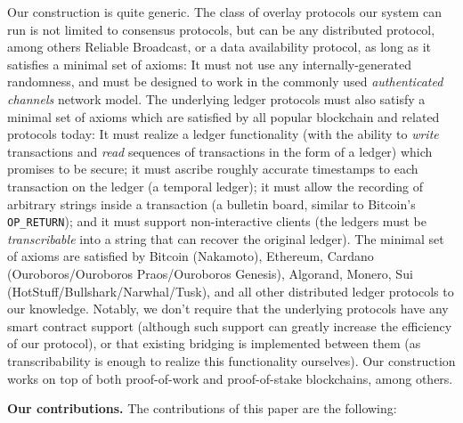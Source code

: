 Our construction is quite generic.
The class of overlay protocols our system can run is not limited to consensus protocols,
but can be any distributed protocol, among others Reliable Broadcast, or a data availability
protocol, as long as it satisfies a minimal set of axioms: It must not use any
internally-generated randomness, and must be designed to work in the commonly used
\emph{authenticated channels} network model. The underlying ledger protocols must also
satisfy a minimal set of axioms which are satisfied by all popular blockchain and
related protocols today: It must realize a ledger functionality (with the ability
to \emph{write} transactions and \emph{read} sequences of transactions in the form of a ledger)
which promises to be secure; it must ascribe roughly accurate timestamps to each transaction on the ledger (a temporal ledger);
it must allow the recording of arbitrary strings inside a transaction (a bulletin board,
similar to Bitcoin's \texttt{OP\_RETURN});
and it must support non-interactive clients (the ledgers must be \emph{transcribable}
into a string that can recover the original ledger).
The minimal set of axioms are satisfied by Bitcoin (Nakamoto), Ethereum, Cardano
(Ouroboros/Ouroboros Praos/Ouroboros Genesis), Algorand, Monero, Sui
(HotStuff/Bullshark/Narwhal/Tusk), and all other distributed ledger protocols
to our knowledge. Notably, we don't require that the underlying protocols have
any smart contract support (although such support can greatly increase the efficiency
of our protocol), or that existing bridging is implemented between them (as
transcribability is enough to realize this functionality ourselves). Our construction works on
top of both proof-of-work and proof-of-stake blockchains, among others.

\noindent
\textbf{Our contributions.} The contributions of this paper are the following:


